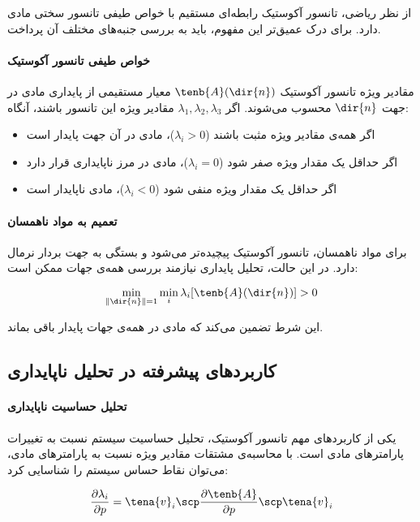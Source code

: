 از نظر ریاضی، تانسور آکوستیک رابطه‌ای مستقیم با خواص طیفی تانسور سختی مادی دارد. برای درک عمیق‌تر این مفهوم، باید به بررسی جنبه‌های مختلف آن پرداخت.

\paragraph{خواص طیفی تانسور آکوستیک}
مقادیر ویژه تانسور آکوستیک $\tenb{A}(\dir{n})$ معیار مستقیمی از پایداری مادی در جهت $\dir{n}$ محسوب می‌شوند. اگر $\lambda_1, \lambda_2, \lambda_3$ مقادیر ویژه این تانسور باشند، آنگاه:

\begin{itemize}
    \item اگر همه‌ی مقادیر ویژه مثبت باشند ($\lambda_i > 0$)، مادی در آن جهت پایدار است
    \item اگر حداقل یک مقدار ویژه صفر شود ($\lambda_i = 0$)، مادی در مرز ناپایداری قرار دارد
    \item اگر حداقل یک مقدار ویژه منفی شود ($\lambda_i < 0$)، مادی ناپایدار است
\end{itemize}

\paragraph{تعمیم به مواد ناهمسان}
برای مواد ناهمسان، تانسور آکوستیک پیچیده‌تر می‌شود و بستگی به جهت بردار نرمال دارد. در این حالت، تحلیل پایداری نیازمند بررسی همه‌ی جهات ممکن است:

\begin{equation}
    \min_{\|\dir{n}\|=1} \min_i \lambda_i[\tenb{A}(\dir{n})] > 0
\end{equation}

این شرط تضمین می‌کند که مادی در همه‌ی جهات پایدار باقی بماند.

\subsection{کاربردهای پیشرفته در تحلیل ناپایداری}

\paragraph{تحلیل حساسیت ناپایداری}
یکی از کاربردهای مهم تانسور آکوستیک، تحلیل حساسیت سیستم نسبت به تغییرات پارامترهای مادی است. با محاسبه‌ی مشتقات مقادیر ویژه نسبت به پارامترهای مادی، می‌توان نقاط حساس سیستم را شناسایی کرد:

\begin{equation}
    \frac{\partial \lambda_i}{\partial p} = \tena{v}_i \scp \frac{\partial \tenb{A}}{\partial p} \scp \tena{v}_i
\end{equation}

